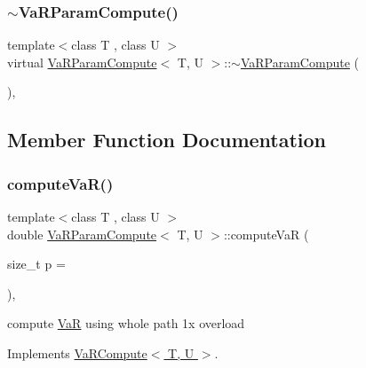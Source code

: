 \subsubsection{\texorpdfstring{$\sim$\+Va\+R\+Param\+Compute()}{~VaRParamCompute()}}
{\footnotesize\ttfamily template$<$class T , class U $>$ \\
virtual \hyperlink{classVaRParamCompute}{Va\+R\+Param\+Compute}$<$ T, U $>$\+::$\sim$\hyperlink{classVaRParamCompute}{Va\+R\+Param\+Compute} (\begin{DoxyParamCaption}{ }\end{DoxyParamCaption})\hspace{0.3cm}{\ttfamily [inline]}, {\ttfamily [virtual]}}



\subsection{Member Function Documentation}
\hypertarget{classVaRParamCompute_a0dcd8d0204328a73526aeb3859b3e159}{}\label{classVaRParamCompute_a0dcd8d0204328a73526aeb3859b3e159} 
\subsubsection{\texorpdfstring{compute\+Va\+R()}{computeVaR()}}
{\footnotesize\ttfamily template$<$class T , class U $>$ \\
double \hyperlink{classVaRParamCompute}{Va\+R\+Param\+Compute}$<$ T, U $>$\+::compute\+VaR (\begin{DoxyParamCaption}\item[{size\+\_\+t}]{p = {} }\end{DoxyParamCaption})\hspace{0.3cm}{\ttfamily [inline]}, {\ttfamily [virtual]}}



compute \hyperlink{classVaR}{VaR} using whole path 1x overload 



Implements \hyperlink{classVaRCompute_a0465221010d248238fe1052958776984}{Va\+R\+Compute$<$ T, U $>$}.

\hypertarget{classVaRParamCompute_abc97057d7e35d8dc98fb3a560be67d0d}{}\label{classVaRParamCompute_abc97057d7e35d8dc98fb3a560be67d0d} 
